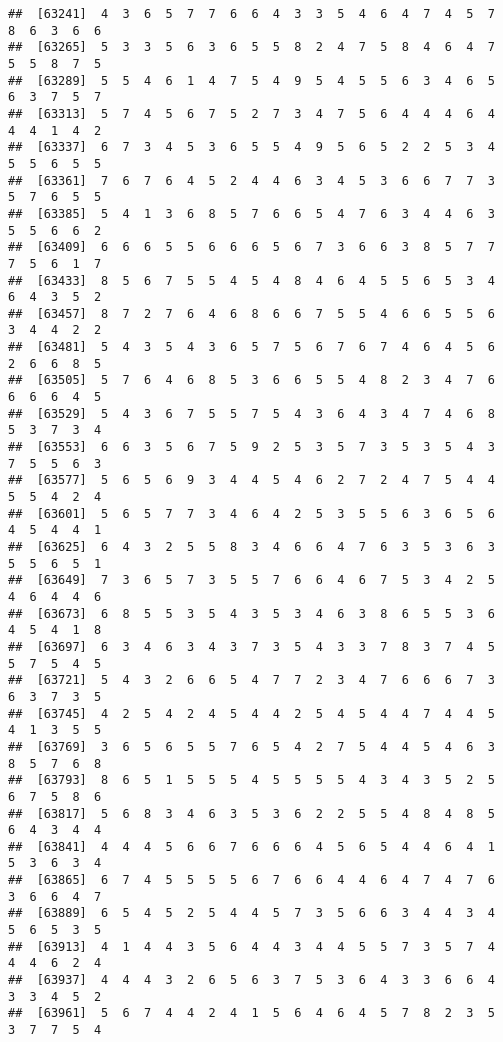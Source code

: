 \documentclass[
]{book}
\begin{document}
\begin{verbatim}
##  [63241]  4  3  6  5  7  7  6  6  4  3  3  5  4  6  4  7  4  5  7  8  6  3  6  6
##  [63265]  5  3  3  5  6  3  6  5  5  8  2  4  7  5  8  4  6  4  7  5  5  8  7  5
##  [63289]  5  5  4  6  1  4  7  5  4  9  5  4  5  5  6  3  4  6  5  6  3  7  5  7
##  [63313]  5  7  4  5  6  7  5  2  7  3  4  7  5  6  4  4  4  6  4  4  4  1  4  2
##  [63337]  6  7  3  4  5  3  6  5  5  4  9  5  6  5  2  2  5  3  4  5  5  6  5  5
##  [63361]  7  6  7  6  4  5  2  4  4  6  3  4  5  3  6  6  7  7  3  5  7  6  5  5
##  [63385]  5  4  1  3  6  8  5  7  6  6  5  4  7  6  3  4  4  6  3  5  5  6  6  2
##  [63409]  6  6  6  5  5  6  6  6  5  6  7  3  6  6  3  8  5  7  7  7  5  6  1  7
##  [63433]  8  5  6  7  5  5  4  5  4  8  4  6  4  5  5  6  5  3  4  6  4  3  5  2
##  [63457]  8  7  2  7  6  4  6  8  6  6  7  5  5  4  6  6  5  5  6  3  4  4  2  2
##  [63481]  5  4  3  5  4  3  6  5  7  5  6  7  6  7  4  6  4  5  6  2  6  6  8  5
##  [63505]  5  7  6  4  6  8  5  3  6  6  5  5  4  8  2  3  4  7  6  6  6  6  4  5
##  [63529]  5  4  3  6  7  5  5  7  5  4  3  6  4  3  4  7  4  6  8  5  3  7  3  4
##  [63553]  6  6  3  5  6  7  5  9  2  5  3  5  7  3  5  3  5  4  3  7  5  5  6  3
##  [63577]  5  6  5  6  9  3  4  4  5  4  6  2  7  2  4  7  5  4  4  5  5  4  2  4
##  [63601]  5  6  5  7  7  3  4  6  4  2  5  3  5  5  6  3  6  5  6  4  5  4  4  1
##  [63625]  6  4  3  2  5  5  8  3  4  6  6  4  7  6  3  5  3  6  3  5  5  6  5  1
##  [63649]  7  3  6  5  7  3  5  5  7  6  6  4  6  7  5  3  4  2  5  4  6  4  4  6
##  [63673]  6  8  5  5  3  5  4  3  5  3  4  6  3  8  6  5  5  3  6  4  5  4  1  8
##  [63697]  6  3  4  6  3  4  3  7  3  5  4  3  3  7  8  3  7  4  5  5  7  5  4  5
##  [63721]  5  4  3  2  6  6  5  4  7  7  2  3  4  7  6  6  6  7  3  6  3  7  3  5
##  [63745]  4  2  5  4  2  4  5  4  4  2  5  4  5  4  4  7  4  4  5  4  1  3  5  5
##  [63769]  3  6  5  6  5  5  7  6  5  4  2  7  5  4  4  5  4  6  3  8  5  7  6  8
##  [63793]  8  6  5  1  5  5  5  4  5  5  5  5  4  3  4  3  5  2  5  6  7  5  8  6
##  [63817]  5  6  8  3  4  6  3  5  3  6  2  2  5  5  4  8  4  8  5  6  4  3  4  4
##  [63841]  4  4  4  5  6  6  7  6  6  6  4  5  6  5  4  4  6  4  1  5  3  6  3  4
##  [63865]  6  7  4  5  5  5  5  6  7  6  6  4  4  6  4  7  4  7  6  3  6  6  4  7
##  [63889]  6  5  4  5  2  5  4  4  5  7  3  5  6  6  3  4  4  3  4  5  6  5  3  5
##  [63913]  4  1  4  4  3  5  6  4  4  3  4  4  5  5  7  3  5  7  4  4  4  6  2  4
##  [63937]  4  4  4  3  2  6  5  6  3  7  5  3  6  4  3  3  6  6  4  3  3  4  5  2
##  [63961]  5  6  7  4  4  2  4  1  5  6  4  6  4  5  7  8  2  3  5  3  7  7  5  4

\end{verbatim}
\end{document}
